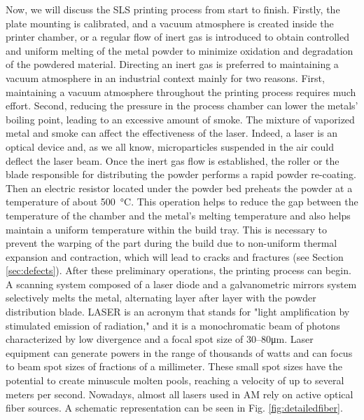 Now, we will discuss the SLS printing process from start to finish. Firstly, the plate mounting is calibrated, and a vacuum atmosphere is created inside the printer chamber, or a regular flow of inert gas is introduced to obtain controlled and uniform melting of the metal powder to minimize oxidation and degradation of the powdered material. Directing an inert gas is preferred to maintaining a vacuum atmosphere in an industrial context mainly for two reasons. First, maintaining a vacuum atmosphere throughout the printing process requires much effort. Second, reducing the pressure in the process chamber can lower the metals' boiling point, leading to an excessive amount of smoke. The mixture of vaporized metal and smoke can affect the effectiveness of the laser. Indeed, a laser is an optical device and, as we all know, microparticles suspended in the air could deflect the laser beam. Once the inert gas flow is established, the roller or the blade responsible for distributing the powder performs a rapid powder re-coating. Then an electric resistor located under the powder bed preheats the powder at a temperature of about \SI{500}{\degreeCelsius}. This operation helps to reduce the gap between the temperature of the chamber and the metal's melting temperature and also helps maintain a uniform temperature within the build tray. This is necessary to prevent the warping of the part during the build due to non-uniform thermal expansion and contraction, which will lead to cracks and fractures (see Section \ref{sec:defects}). After these preliminary operations, the printing process can begin. A scanning system composed of a laser diode and a galvanometric mirrors system selectively melts the metal, alternating layer after layer with the powder distribution blade. LASER is an acronym that stands for "light amplification by stimulated emission of radiation," and it is a monochromatic beam of photons characterized by low divergence and a focal spot size of \numrange[range-phrase = --]{30}{80}\unit{\micro\metre}. Laser equipment can generate powers in the range of thousands of watts and can focus to beam spot sizes of fractions of a millimeter. These small spot sizes have the potential to create minuscule molten pools, reaching a velocity of up to several meters per second. Nowadays, almost all lasers used in AM rely on active optical fiber sources. A schematic representation can be seen in Fig. \ref{fig:detailedfiber}. 
